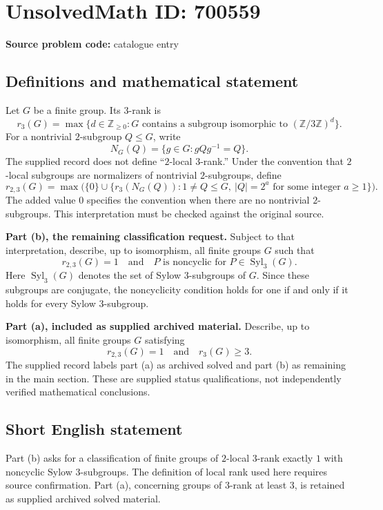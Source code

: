 \documentclass[11pt]{article}
\newcommand{\Z}{\mathbb{Z}}
\begin{document}
\section*{UnsolvedMath ID: 700559}
\textbf{Source problem code:} catalogue entry
\subsection{Definitions and mathematical statement}
Let \(G\) be a finite group. Its \(3\)-rank is
\[
r_3(G)=\max\{d\in\Z_{\geq 0}:G\text{ contains a subgroup isomorphic to }(\Z/3\Z)^d\}.
\]
For a nontrivial \(2\)-subgroup \(Q\leq G\), write
\[
N_G(Q)=\{g\in G:gQg^{-1}=Q\}.
\]
The supplied record does not define ``\(2\)-local \(3\)-rank.'' Under the convention that \(2\)-local subgroups are normalizers of nontrivial \(2\)-subgroups, define
\[
r_{2,3}(G)=\max\bigl(\{0\}\cup\{r_3(N_G(Q)):1\neq Q\leq G,\ |Q|=2^a\text{ for some integer }a\geq1\}\bigr).
\]
The added value \(0\) specifies the convention when there are no nontrivial \(2\)-subgroups. This interpretation must be checked against the original source.

\textbf{Part (b), the remaining classification request.} Subject to that interpretation, describe, up to isomorphism, all finite groups \(G\) such that
\[
r_{2,3}(G)=1
\quad\text{and}\quad
P\text{ is noncyclic for }P\in\operatorname{Syl}_3(G).
\]
Here \(\operatorname{Syl}_3(G)\) denotes the set of Sylow \(3\)-subgroups of \(G\). Since these subgroups are conjugate, the noncyclicity condition holds for one if and only if it holds for every Sylow \(3\)-subgroup.

\textbf{Part (a), included as supplied archived material.} Describe, up to isomorphism, all finite groups \(G\) satisfying
\[
r_{2,3}(G)=1\quad\text{and}\quad r_3(G)\geq3.
\]
The supplied record labels part (a) as archived solved and part (b) as remaining in the main section. These are supplied status qualifications, not independently verified mathematical conclusions.
\subsection{Short English statement}
Part (b) asks for a classification of finite groups of \(2\)-local \(3\)-rank exactly \(1\) with noncyclic Sylow \(3\)-subgroups. The definition of local rank used here requires source confirmation. Part (a), concerning groups of \(3\)-rank at least \(3\), is retained as supplied archived solved material.
\end{document}
